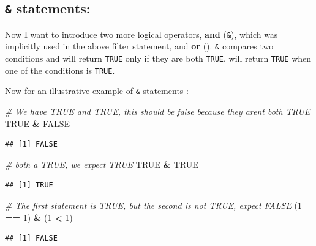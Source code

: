\documentclass[
]{book}
\newenvironment{Shaded}{\begin{snugshade}}{\end{snugshade}}
\newcommand{\CommentTok}[1]{\textcolor[rgb]{0.56,0.35,0.01}{\textit{#1}}}
\newcommand{\DecValTok}[1]{\textcolor[rgb]{0.00,0.00,0.81}{#1}}
\newcommand{\NormalTok}[1]{#1}
\newcommand{\OperatorTok}[1]{\textcolor[rgb]{0.81,0.36,0.00}{\textbf{#1}}}
\newcommand{\OtherTok}[1]{\textcolor[rgb]{0.56,0.35,0.01}{#1}}
\newcommand{\StringTok}[1]{\textcolor[rgb]{0.31,0.60,0.02}{#1}}
\begin{document}
\hypertarget{statements}{%
\subsection{\texorpdfstring{\texttt{\&} statements:}{\& statements:}}\label{statements}}

Now I want to introduce two more logical operators, \textbf{and} (\texttt{\&}), which was implicitly used in the above filter statement, and \textbf{or} (\texttt{\textbar{}}). \texttt{\&} compares two conditions and will return \texttt{TRUE} only if they are both \texttt{TRUE}. \texttt{\textbar{}} will return \texttt{TRUE} when one of the conditions is \texttt{TRUE}.

Now for an illustrative example of \texttt{\&} statements :

\begin{Shaded}
\begin{Highlighting}[]
\CommentTok{\# We have TRUE and TRUE, this should be false because they aren\textquotesingle{}t both TRUE}
\OtherTok{TRUE} \OperatorTok{\&}\StringTok{ }\OtherTok{FALSE} 
\end{Highlighting}
\end{Shaded}

\begin{verbatim}
## [1] FALSE
\end{verbatim}

\begin{Shaded}
\begin{Highlighting}[]
\CommentTok{\# both a TRUE, we expect TRUE}
\OtherTok{TRUE} \OperatorTok{\&}\StringTok{ }\OtherTok{TRUE}
\end{Highlighting}
\end{Shaded}

\begin{verbatim}
## [1] TRUE
\end{verbatim}

\begin{Shaded}
\begin{Highlighting}[]
\CommentTok{\# The first statement is TRUE, but the second is not TRUE, expect FALSE}
\NormalTok{(}\DecValTok{1} \OperatorTok{==}\StringTok{ }\DecValTok{1}\NormalTok{) }\OperatorTok{\&}\StringTok{ }\NormalTok{(}\DecValTok{1} \OperatorTok{\textless{}}\StringTok{ }\DecValTok{1}\NormalTok{)}
\end{Highlighting}
\end{Shaded}

\begin{verbatim}
## [1] FALSE
\end{verbatim}
\end{document}
